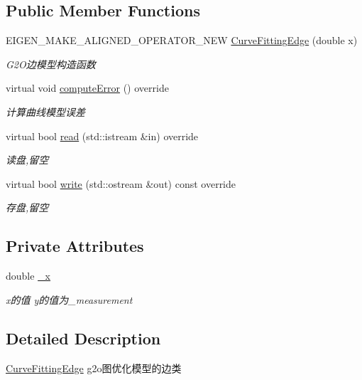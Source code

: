 \subsection*{Public Member Functions}
\begin{DoxyCompactItemize}
\item 
E\+I\+G\+E\+N\+\_\+\+M\+A\+K\+E\+\_\+\+A\+L\+I\+G\+N\+E\+D\+\_\+\+O\+P\+E\+R\+A\+T\+O\+R\+\_\+\+N\+EW \hyperlink{classCurveFittingEdge_a3a7ee01bc38a44a179faa78d78bcdc0b}{Curve\+Fitting\+Edge} (double x)
\begin{DoxyCompactList}\small\item\em G2\+O边模型构造函数 \end{DoxyCompactList}\item 
virtual void \hyperlink{classCurveFittingEdge_a4497b29e2f168d877d7a858457b69fd1}{compute\+Error} () override
\begin{DoxyCompactList}\small\item\em 计算曲线模型误差 \end{DoxyCompactList}\item 
virtual bool \hyperlink{classCurveFittingEdge_a517490d29ac656c6a0fc100b1af7cd9f}{read} (std\+::istream \&in) override
\begin{DoxyCompactList}\small\item\em 读盘,留空 \end{DoxyCompactList}\item 
virtual bool \hyperlink{classCurveFittingEdge_a70bde4a6cbed5fc825a069c6f1f45caa}{write} (std\+::ostream \&out) const override
\begin{DoxyCompactList}\small\item\em 存盘,留空 \end{DoxyCompactList}\end{DoxyCompactItemize}
\subsection*{Private Attributes}
\begin{DoxyCompactItemize}
\item 
double \hyperlink{classCurveFittingEdge_ad0cf7b012c9e4585a6919b982f148449}{\+\_\+x}
\begin{DoxyCompactList}\small\item\em x的值 y的值为\+\_\+measurement \end{DoxyCompactList}\end{DoxyCompactItemize}


\subsection{Detailed Description}
\hyperlink{classCurveFittingEdge}{Curve\+Fitting\+Edge} g2o图优化模型的边类 

